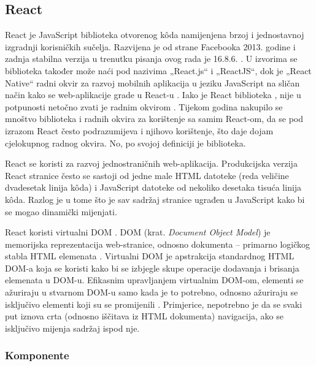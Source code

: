 \documentclass[times, utf8, diplomski, numeric]{fer}
\newcommand{\razmakp}{\vspace{18pt}}
\newcommand{\razmaks}{\vspace{10pt}}
\begin{document}
\razmaks
\subsection{React} \label{sec:react}

React je JavaScript biblioteka otvorenog kôda namijenjena brzoj i jednostavnoj izgradnji korisničkih sučelja.
Razvijena je od strane Facebooka 2013. godine i zadnja stabilna verzija u trenutku pisanja ovog rada je 16.8.6. \citep{gh_react_changelog}.
U izvorima se biblioteka također može naći pod nazivima „React.js“ i „ReactJS“, dok je „React Native“ radni okvir za razvoj mobilnih aplikacija u jeziku JavaScript na sličan način kako se web-aplikacije grade u React-u \citep{wiki_react}.
Iako je React biblioteka , nije u potpunosti netočno zvati je radnim okvirom .
Tijekom godina nakupilo se mnoštvo biblioteka i radnih okvira za korištenje sa samim React-om, da se pod izrazom React često podrazumijeva i njihovo korištenje, što daje dojam cjelokupnog radnog okvira. No, po svojoj definiciji je biblioteka.

React se koristi za razvoj jednostraničnih  web-aplikacija.
Produkcijska verzija React stranice često se sastoji od jedne male HTML datoteke (reda veličine dvadesetak linija kôda) i JavaScript datoteke od nekoliko desetaka tisuća linija kôda.
Razlog je u tome što je sav sadržaj stranice ugrađen u JavaScript kako bi se mogao dinamički mijenjati.

\razmakp

React koristi virtualni DOM .
DOM (krat. \emph{Document Object Model}) je memorijska reprezentacija web-stranice, odnosno dokumenta – primarno logičkog stabla HTML elemenata \citep{mdn_dom}.
Virtualni DOM je apstrakcija standardnog HTML DOM-a koja se koristi kako bi se izbjegle skupe operacije dodavanja i brisanja elemenata u DOM-u.
Efikasnim upravljanjem virtualnim DOM-om, elementi se ažuriraju u stvarnom DOM-u samo kada je to potrebno, odnosno ažuriraju se isključivo elementi koji su se promijenili \citep{med_vdom}.
Primjerice, nepotrebno je da se svaki put iznova crta (odnosno iščitava iz HTML dokumenta) navigacija, ako se isključivo mijenja sadržaj ispod nje.

\razmakp
\subsubsection{Komponente}
\end{document}
